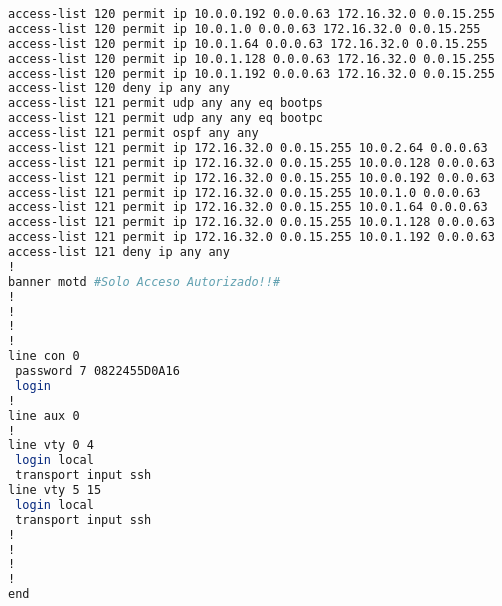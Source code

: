 \begin{lstlisting}[language=Bash, caption={Configuración Completa Switch IoMT Planta 2}]
access-list 120 permit ip 10.0.0.192 0.0.0.63 172.16.32.0 0.0.15.255
access-list 120 permit ip 10.0.1.0 0.0.0.63 172.16.32.0 0.0.15.255
access-list 120 permit ip 10.0.1.64 0.0.0.63 172.16.32.0 0.0.15.255
access-list 120 permit ip 10.0.1.128 0.0.0.63 172.16.32.0 0.0.15.255
access-list 120 permit ip 10.0.1.192 0.0.0.63 172.16.32.0 0.0.15.255
access-list 120 deny ip any any
access-list 121 permit udp any any eq bootps
access-list 121 permit udp any any eq bootpc
access-list 121 permit ospf any any
access-list 121 permit ip 172.16.32.0 0.0.15.255 10.0.2.64 0.0.0.63
access-list 121 permit ip 172.16.32.0 0.0.15.255 10.0.0.128 0.0.0.63
access-list 121 permit ip 172.16.32.0 0.0.15.255 10.0.0.192 0.0.0.63
access-list 121 permit ip 172.16.32.0 0.0.15.255 10.0.1.0 0.0.0.63
access-list 121 permit ip 172.16.32.0 0.0.15.255 10.0.1.64 0.0.0.63
access-list 121 permit ip 172.16.32.0 0.0.15.255 10.0.1.128 0.0.0.63
access-list 121 permit ip 172.16.32.0 0.0.15.255 10.0.1.192 0.0.0.63
access-list 121 deny ip any any
!
banner motd #Solo Acceso Autorizado!!#
!
!
!
!
line con 0
 password 7 0822455D0A16
 login
!
line aux 0
!
line vty 0 4
 login local
 transport input ssh
line vty 5 15
 login local
 transport input ssh
!
!
!
!
end


\end{lstlisting}
